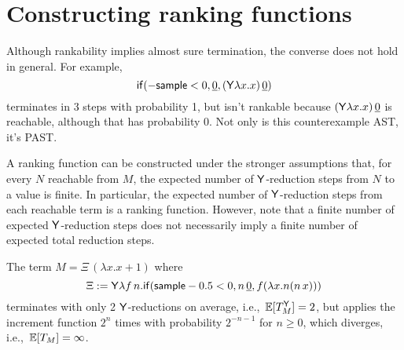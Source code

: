 \section{Constructing ranking functions}
\label{sec:ranking}

Although rankability implies almost sure termination, the converse does not hold in general. For example,
\begin{equation}
\tif{{-}\tsample < 0}{\underline{0}}{(\tY \lambda x. x) \, \underline 0}
\label{ex:0 probability reachable}
\end{equation}
terminates in 3 steps with probability 1, but isn't rankable because $(\mathsf{Y} \lambda x. x) \, \underline 0$ is reachable, although that has probability 0. 
Not only is this counterexample AST, it's PAST. %

A ranking function can be constructed under the stronger assumptions that, for every $N$ reachable from $M$, the expected number of $\mathsf{Y}$-reduction steps from $N$ to a value is finite. 
In particular, the expected number of $\mathsf{Y}$-reduction steps from each reachable term is a ranking function. 
However, note that a finite number of expected $\mathsf{Y}$-reduction steps does not necessarily imply a finite number of expected total reduction steps.

\begin{example}
\label{ex:tY finite does not imply t finite}
The term $M = \Xi \, (\lambda x. x+1)$ where
\[
\Xi := \mathsf{Y} \lambda f \, n. \mathsf{if}(\mathsf{sample} - 0.5 < 0, n \, \underline 0, f (\lambda x. n (n \, x)))
\] 
terminates with only 2 $\mathsf{Y}$-reductions on average, i.e.,~$\mathbb{E}[T_M^{\mathsf{Y}}] = 2$, but applies the increment function $2^n$ times with probability $2^{-n-1}$ for $n \geq 0$, which diverges, i.e.,~$\mathbb{E}[T_M] = \infty$.
\end{example}

